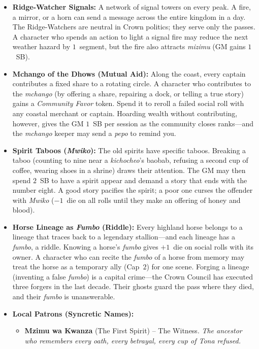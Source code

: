 \begin{itemize}
\item \textbf{Ridge-Watcher Signals:} A network of signal towers on every peak. A fire, a mirror, or a horn can send a message across the entire kingdom in a day. The Ridge-Watchers are neutral in Crown politics; they serve only the passes. A character who spends an action to light a signal fire may reduce the next weather hazard by $1$~segment, but the fire also attracts \textit{mizimu} (GM gains $1$~SB).
\item \textbf{Mchango of the Dhows (Mutual Aid):} Along the coast, every captain contributes a fixed share to a rotating circle. A character who contributes to the \textit{mchango} (by offering a share, repairing a dock, or telling a true story) gains a \emph{Community Favor} token. Spend it to reroll a failed social roll with any coastal merchant or captain. Hoarding wealth without contributing, however, gives the GM $1$~SB per session as the community closes ranks---and the \textit{mchango} keeper may send a \textit{pepo} to remind you.
\item \textbf{Spirit Taboos (\textit{Mwiko}):} The old spirits have specific taboos. Breaking a taboo (counting to nine near a \textit{kichocheo}'s baobab, refusing a second cup of coffee, wearing shoes in a shrine) draws their attention. The GM may then spend $2$~SB to have a spirit appear and demand a story that ends with the number eight. A good story pacifies the spirit; a poor one curses the offender with \textit{Mwiko} ($-1$~die on all rolls until they make an offering of honey and blood).
\item \textbf{Horse Lineage as \textit{Fumbo} (Riddle):} Every highland horse belongs to a lineage that traces back to a legendary stallion---and each lineage has a \textit{fumbo}, a riddle. Knowing a horse's \textit{fumbo} gives $+1$~die on social rolls with its owner. A character who can recite the \textit{fumbo} of a horse from memory may treat the horse as a temporary ally (Cap~$2$) for one scene. Forging a lineage (inventing a false \textit{fumbo}) is a capital crime---the Crown Council has executed three forgers in the last decade. Their ghosts guard the pass where they died, and their \textit{fumbo} is unanswerable.
\item \textbf{Local Patrons (Syncretic Names):}
  \begin{itemize}
    \item \textbf{Mzimu wa Kwanza} (The First Spirit) -- The Witness. \textit{The ancestor who remembers every oath, every betrayal, every cup of \textit{Tona} refused.}

\end{itemize}
\end{itemize}
